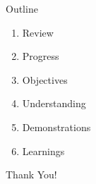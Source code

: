 \documentclass{beamer}
\begin{document}
\begin{frame}\titlepage\end{frame}\normalfont


\begin{frame}{Outline}
	\begin{enumerate}
            \item Review
		\item Progress
            \item Objectives
            \item Understanding
            \item Demonstrations
            \item Learnings
	\end{enumerate}
\end{frame}\normalfont

\begin{frame}
	\LARGE{Thank You!}
\end{frame}\normalfont
\end{document}
